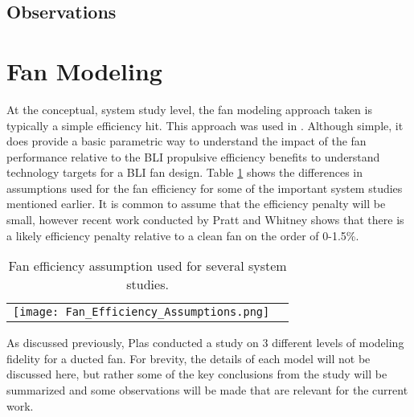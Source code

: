 \subsection{Observations}

\section{Fan Modeling}
\indent At the conceptual, system study level, the fan modeling approach taken is typically a simple efficiency hit.  This approach was used in \cite{Felder2011} \cite{Sato2011} \cite{Hardin2012} \cite{Nickol2009}  .  Although simple, it does provide a basic parametric way to understand the impact of the fan performance relative to the BLI propulsive efficiency benefits to understand technology targets for a BLI fan design.  Table \ref{Fan_Efficiency_Assumptions} shows the differences in assumptions used for the fan efficiency for some of the important system studies mentioned earlier.  It is common to assume that the efficiency penalty will be small, however recent work conducted by Pratt and Whitney \cite{Florea2013} shows that there is a likely efficiency penalty relative to a clean fan on the order of 0-1.5\%.  

\begin{table}[ht]
\caption{Fan efficiency assumption used for several system studies.}
\centering
\begin{tabular}{cc}
\texttt{[image: Fan\_Efficiency\_Assumptions.png]}
\end{tabular}
\label{Fan_Efficiency_Assumptions}
\end{table}

As discussed previously, Plas \cite{Plas2007} conducted a study on 3 different levels of modeling fidelity for a ducted fan.  For brevity, the details of each model will not be discussed here, but rather some of the key conclusions from the study will be summarized and some observations will be made that are relevant for the current work.


